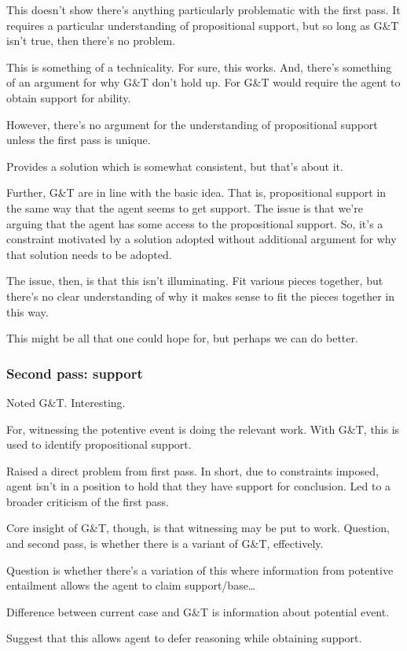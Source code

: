 {
  \color{green}
  \begin{note}
    This doesn't show there's anything particularly problematic with the first pass.
    It requires a particular understanding of propositional support, but so long as G\&T isn't true, then there's no problem.

    This is something of a technicality.
    For sure, this works.
    And, there's something of an argument for why G\&T don't hold up.
    For G\&T would require the agent to obtain support for ability.

    However, there's no argument for the understanding of propositional support unless the first pass is unique.

    Provides a solution which is somewhat consistent, but that's about it.

    Further, G\&T are in line with the basic idea.
    That is, propositional support in the same way that the agent seems to get support.
    The issue is that we're arguing that the agent has some access to the propositional support.
    So, it's a constraint motivated by a solution adopted without additional argument for why that solution needs to be adopted.

    The issue, then, is that this isn't illuminating.
    Fit various pieces together, but there's no clear understanding of why it makes sense to fit the pieces together in this way.

    This might be all that one could hope for, but perhaps we can do better.
  \end{note}
}

\subsubsection{Second pass: \future{} support}
\label{sec:second-pass:-futures}

\begin{note}
  Noted G\&T.
  Interesting.

  For, witnessing the potentive event is doing the relevant work.
  With G\&T, this is used to identify propositional support.

  Raised a direct problem from first pass.
  In short, due to constraints imposed, agent isn't in a position to hold that they have support for conclusion.
  Led to a broader criticism of the first pass.

  Core insight of G\&T, though, is that witnessing may be put to work.
  Question, and second pass, is whether there is a variant of G\&T, effectively.


  Question is whether there's a variation of this where information from potentive entailment allows the agent to claim support/base\dots

  Difference between current case and G\&T is information about potential event.

  Suggest that this allows agent to defer reasoning while obtaining support.
\end{note}

